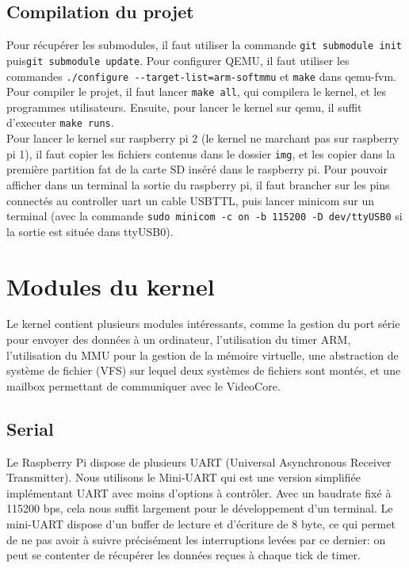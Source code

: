 \documentclass[a4paper]{article}
\begin{document}
\subsection{Compilation du projet}

Pour récupérer les submodules, il faut utiliser la commande \verb!git submodule init!
puis\verb!git submodule update!. Pour configurer QEMU, il faut utiliser les
commandes \verb!./configure --target-list=arm-softmmu! et \verb!make! dans qemu-fvm.\\

Pour compiler le projet, il faut lancer \verb!make all!, qui compilera le kernel,
et les programmes utilisateurs. Ensuite, pour lancer le kernel sur qemu, il
suffit d'executer \verb!make runs!.\\

Pour lancer le kernel sur raspberry pi 2 (le
kernel ne marchant pas sur raspberry pi 1), il faut copier les fichiers contenus
dans le dossier \verb!img!, et les copier dans la première partition fat de la
carte SD inséré dans le raspberry pi. Pour pouvoir afficher dans un terminal la
sortie du raspberry pi, il faut brancher sur les pins connectés au controller
uart un cable USBTTL, puis lancer minicom sur un terminal (avec la commande
\verb!sudo minicom -c on -b 115200 -D dev/ttyUSB0! si la sortie est située dans
ttyUSB0).


\section{Modules du kernel}
Le kernel contient plusieurs modules intéressants, comme la gestion du port série
pour envoyer des données à un ordinateur, l'utilisation du timer ARM,
l'utilisation du MMU pour la gestion de la mémoire virtuelle, une abstraction de
système de fichier (VFS) sur lequel deux systèmes de fichiers sont montés, et
une mailbox permettant de communiquer avec le VideoCore.

\subsection{Serial}
Le Raspberry Pi dispose de plusieurs UART (Universal Asynchronous Receiver Transmitter).
Nous utilisons le Mini-UART qui est une version simplifiée implémentant UART avec
moins d'options à contrôler. Avec un baudrate fixé à 115200 bps, cela nous suffit
largement pour le développement d'un terminal.
Le mini-UART dispose d'un buffer de lecture et d'écriture de 8 byte, ce qui permet
de ne pas avoir à suivre précisément les interruptions levées par ce dernier:
on peut se contenter de récupérer les données reçues à chaque tick de timer.
\end{document}
